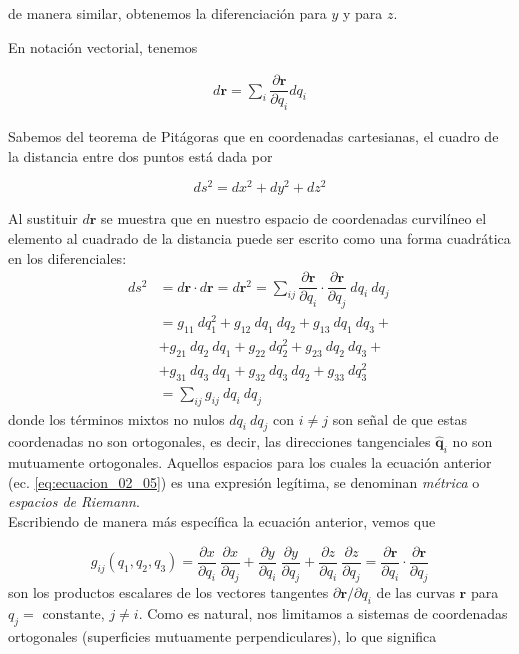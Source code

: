 de manera similar, obtenemos la diferenciación para $y$ y para $z$.

En notación vectorial, tenemos

\begin{align*} d \mathbf{r} = \sum_{i} \dfrac{\partial \mathbf{r}}{\partial q_{i}} d q_{i}
\end{align*}

Sabemos del teorema de Pitágoras que en coordenadas cartesianas, el cuadro de la distancia entre dos puntos está dada por

\[ ds^{2} = dx^{2} + dy^{2} + dz^{2} \]

Al sustituir $d\mathbf{r}$ se muestra que en nuestro espacio de coordenadas curvilíneo el elemento al cuadrado de la distancia puede ser escrito como una forma cuadrática en los diferenciales:
\begin{align}
ds^{2} &= d\mathbf{r} \cdot d \mathbf{r} =  d\mathbf{r}^{2} =  \sum_{ij} \dfrac{\partial \mathbf{r}}{\partial q_{i}} \cdot \dfrac{\partial \mathbf{r}}{\partial q_{j}} \: dq_{i} \: dq_{j} \nonumber \\
&= g_{11} \: dq_{1}^{2} + g_{12} \: dq_{1} \: dq_{2} + g_{13} \: dq_{1} \: dq_{3} + \nonumber \\
&+ g_{21} \: dq_{2} \: dq_{1} + g_{22} \: dq_{2}^{2} + g_{23} \: dq_{2} \: dq_{3} + \nonumber \\
&+ g_{31} \: dq_{3} \: dq_{1} + g_{32} \: dq_{3} \: dq_{2} + g_{33} \: dq_{3}^{2} \nonumber \\
&= \sum_{ij} g_{ij} \: dq_{i} \: dq_{j}
\label{eq:ecuacion_02_05}
\end{align}
donde los términos mixtos no nulos $dq_{i} \: dq_{j}$ con $i \neq j$ son señal de que estas coordenadas no son ortogonales, es decir, las direcciones tangenciales $\mathbf{\widehat{q}}_{i}$ no son mutuamente ortogonales. Aquellos espacios para los cuales la ecuación anterior (ec. \ref{eq:ecuacion_02_05}) es una expresión legítima, se denominan \emph{métrica} o \emph{espacios de Riemann}.
\\
Escribiendo de manera más específica la ecuación anterior, vemos que

\begin{equation}
g_{ij}(q_{1}, q_{2}, q_{3}) = \dfrac{\partial x}{\partial q_{i}} \: \dfrac{\partial x}{\partial q_{j}} + \dfrac{\partial y}{\partial q_{i}} \: \dfrac{\partial y}{\partial q_{j}} + \dfrac{\partial z}{\partial q_{i}} \: \dfrac{\partial z}{\partial q_{j}} = \dfrac{\partial \mathbf{r}}{\partial q_{i}} \cdot \dfrac{\partial \mathbf{r}}{\partial q_{j}}
\label{eq:ecuacion_02_06}
\end{equation}
son los productos escalares de los vectores tangentes $\partial \mathbf{r} / \partial q_{i}$ de las curvas $\mathbf{r}$ para $q_{j} = \mbox{ constante}$, $j \neq i$. Como es natural, nos limitamos a  sistemas de coordenadas ortogonales (superficies mutuamente perpendiculares), lo que significa

